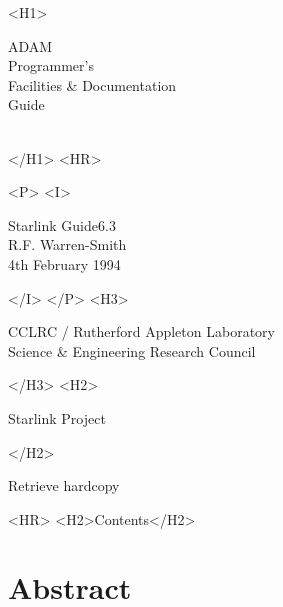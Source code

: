 \documentclass[twoside,11pt]{article}
\newcommand{\stardoccategory}  {Starlink Guide}
\newcommand{\stardocnumber}    {6.3}
\newcommand{\stardocauthors}   {R.F. Warren-Smith}
\newcommand{\stardocdate}      {4th February 1994}
\newcommand{\stardoctitle}     {ADAM\\[0.75ex]
                                Programmer's\\
                                Facilities \& Documentation\\
                                Guide}
\newcommand{\htmladdnormallink}[2]{#1}
\newcommand{\htmladdimg}[1]{}
\newcommand{\htmlref}[2]{#1}
\newcommand{\htmladdtonavigation}[1]{}
\newcommand{\xlabel}[1]{}
\newcommand{\latexonlytoc}[0]{\tableofcontents}
\begin{document}
\begin{htmlonly}
   \xlabel{}
   \begin{rawhtml} <H1> \end{rawhtml}
      \stardoctitle\\
      \stardocversion\\
      \stardocmanual
   \begin{rawhtml} </H1> <HR> \end{rawhtml}


   \begin{rawhtml} <P> <I> \end{rawhtml}
   \stardoccategory \stardocnumber \\
   \stardocauthors \\
   \stardocdate
   \begin{rawhtml} </I> </P> <H3> \end{rawhtml}
      \htmladdnormallink{CCLRC}{http://www.cclrc.ac.uk} /
      \htmladdnormallink{Rutherford Appleton Laboratory}
                        {http://www.cclrc.ac.uk/ral} \\
      \htmladdnormallink{Science \& Engineering Research Council}
                        {http://www.stfc.ac.uk} \\
   \begin{rawhtml} </H3> <H2> \end{rawhtml}
      \htmladdnormallink{Starlink Project}{http://star-www.rl.ac.uk/}
   \begin{rawhtml} </H2> \end{rawhtml}
   \htmladdnormallink{\htmladdimg{source.gif} Retrieve hardcopy}
      {http://star-www.rl.ac.uk/cgi-bin/hcserver?\stardocsource}\\

  \label{stardoccontents}
  \begin{rawhtml} 
    <HR>
    <H2>Contents</H2>
  \end{rawhtml}
  \newcommand{\latexonlytoc}[0]{}
  \htmladdtonavigation{\htmlref{\htmladdimg{contents_motif.gif}}
        {stardoccontents}}

  \section{\xlabel{abstract}Abstract}
\end{htmlonly}
\end{document}
